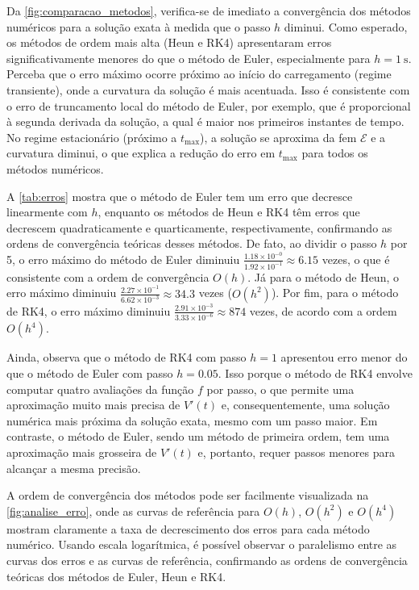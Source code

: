 \documentclass[11pt]{article}
\begin{document}
Da \autoref{fig:comparacao_metodos}, verifica-se de imediato a convergência dos métodos numéricos para a solução exata à medida que o passo \(h\) diminui. Como esperado, os métodos de ordem mais alta (Heun e RK4) apresentaram erros significativamente menores do que o método de Euler, especialmente para \(h=\qty{1}{\second}\). Perceba que o erro máximo ocorre próximo ao início do carregamento (regime transiente), onde a curvatura da solução é mais acentuada. Isso é consistente com o erro de truncamento local do método de Euler, por exemplo, que é proporcional à segunda derivada da solução, a qual é maior nos primeiros instantes de tempo. No regime estacionário (próximo a \(t_{\max}\)), a solução se aproxima da fem \(\mathcal{E}\) e a curvatura diminui, o que explica a redução do erro em \(t_{\max}\) para todos os métodos numéricos.

A \autoref{tab:erros} mostra que o método de Euler tem um erro que decresce linearmente com \(h\), enquanto os métodos de Heun e RK4 têm erros que decrescem quadraticamente e quarticamente, respectivamente, confirmando as ordens de convergência teóricas desses métodos. De fato, ao dividir o passo \(h\) por \num{5}, o erro máximo do método de Euler diminuiu \(\frac{1.18 \times 10^{-0}}{1.92 \times 10^{-1}} \approx 6.15\) vezes, o que é consistente com a ordem de convergência \(O(h)\). Já para o método de Heun, o erro máximo diminuiu \(\frac{2.27 \times 10^{-1}}{6.62 \times 10^{-3}} \approx 34.3\) vezes (\(O(h^2)\)). Por fim, para o método de RK4, o erro máximo diminuiu \(\frac{2.91 \times 10^{-3}}{3.33 \times 10^{-6}} \approx 874\) vezes, de acordo com a ordem \(O(h^4)\).

Ainda, observa que o método de RK4 com passo \(h=1\) apresentou erro menor do que o método de Euler com passo \(h=0.05\). Isso porque o método de RK4 envolve computar quatro avaliações da função \(f\) por passo, o que permite uma aproximação muito mais precisa de \(V'(t)\) e, consequentemente, uma solução numérica mais próxima da solução exata, mesmo com um passo maior. Em contraste, o método de Euler, sendo um método de primeira ordem, tem uma aproximação mais grosseira de \(V'(t)\) e, portanto, requer passos menores para alcançar a mesma precisão.

A ordem de convergência dos métodos pode ser facilmente visualizada na \autoref{fig:analise_erro}, onde as curvas de referência para \(O(h)\), \(O(h^2)\) e \(O(h^4)\) mostram claramente a taxa de decrescimento dos erros para cada método numérico. Usando escala logarítmica, é possível observar o paralelismo entre as curvas dos erros e as curvas de referência, confirmando as ordens de convergência teóricas dos métodos de Euler, Heun e RK4.

\printbibliography
\end{document}
